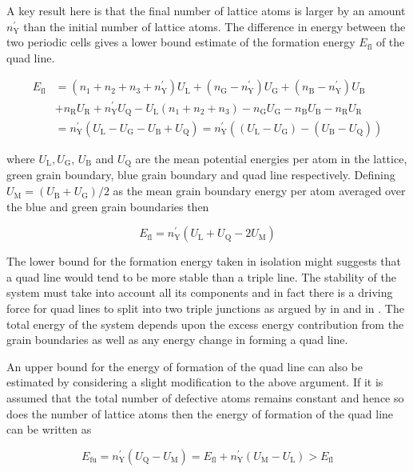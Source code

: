 \documentclass[12pt,a4paper,openany]{report}
\newcommand{\ts}[1]{\textrm{#1}}
\begin{document}
A key result here is that the final number of lattice atoms is larger by an amount $n_{\ts{Y}}^{\prime}$ than the initial number of lattice atoms. The difference in energy between the two periodic cells gives a lower bound estimate of the formation energy $E_{\ts{fl}}$ of the quad line.

\begin{align*}
 E_{\ts{fl}} &= (n_1+n_2+n_3+n_{\ts{Y}}^{\prime}) U_{\ts{L}} + (n_{\ts{G}} - n_{\ts{Y}}^{\prime}) U_{\ts{G}}
+ (n_{\ts{B}} - n_{\ts{Y}}^{\prime}) U_{\ts{B}} \\ 
&+ n_{\ts{R}} U_{\ts{R}}  + n_{\ts{Y}}^{\prime} U_{\ts{Q}} 
- U_{\ts{L}}(n_1+n_2+n_3) - n_{\ts{G}} U_{\ts{G}}  - n_{\ts{B}} U_{\ts{B}}  - n_{\ts{R}} U_{\ts{R}}   
\\ 
&=  n_{\ts{Y}}^{\prime}(U_{\ts{L}} - U_{\ts{G}} - U_{\ts{B}} + U_{\ts{Q}}) = n_{\ts{Y}}^{\prime}((U_{\ts{L}} - U_{\ts{G}}) - (U_{\ts{B}} - U_{\ts{Q}})) 
\end{align*}

where $U_{\ts{L}}, U_{\ts{G}}$, $U_{\ts{B}}$ and $U_{\ts{Q}}$ are the mean potential energies per atom in the lattice, green grain boundary, blue grain boundary
and quad line respectively. Defining $U_{\ts{M}} = (U_{\ts{B}} + U_{\ts{G}})/2$ as the mean grain boundary energy per atom averaged over the blue and green grain boundaries then

\[E_{\ts{fl}} =  n_{\ts{Y}}^{\prime}(U_{\ts{L}} + U_{\ts{Q}} - 2U_{\ts{M}})\]

The lower bound for the formation energy taken in isolation might suggests that a quad line would tend to be more stable than a triple line. The stability of the system must take into account all its components and in fact there is a driving force for quad lines to split into two triple junctions as argued by \citeauthor{Lazar2011} in \cite{Lazar2011} and \citeauthor{Kinderlehrer2006} in \cite{Kinderlehrer2006}. The total energy of the system depends upon the excess energy contribution from the grain boundaries as well as any energy change in forming a quad line.

An upper bound for the energy of formation of the quad line can also be estimated by considering a slight modification to the above argument.  If it is assumed that the total number of defective atoms remains constant and hence so does the number of lattice atoms then the energy of formation of the quad line can
be written as

\[E_{\ts{fu}} =  n_{\ts{Y}}^{\prime}(U_{\ts{Q}} - U_{\ts{M}}) = E_{\ts{fl}} + n_{\ts{Y}}^{\prime}(U_{\ts{M}} - U_{\ts{L}}) > E_{\ts{fl}} \]
\end{document}
